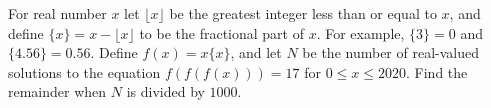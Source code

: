 For real number $x$ let $\lfloor x\rfloor$ be the greatest integer less than or equal to $x$, and define $\{x\}=x-\lfloor x\rfloor$ to be the fractional part of $x$. For example, $\{3\}=0$ and $\{4.56\}=0.56$. Define $f(x)=x\{x\}$, and let $N$ be the number of real-valued solutions to the equation $f(f(f(x)))=17$ for $0\leq x\leq 2020$. Find the remainder when $N$ is divided by $1000$.